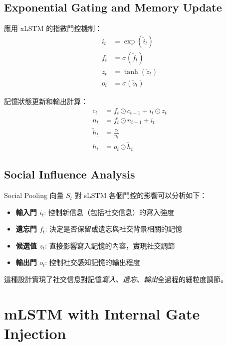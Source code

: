 \documentclass[11pt,a4paper]{article}
\begin{document}
\subsection{Exponential Gating and Memory Update}

應用 xLSTM 的指數門控機制：
\begin{align}
i_t &= \exp(\tilde{i}_t) \label{eq:slstm_exp_input} \\
f_t &= \sigma(\tilde{f}_t) \label{eq:slstm_sigmoid_forget} \\
z_t &= \tanh(\tilde{z}_t) \label{eq:slstm_tanh_candidate} \\
o_t &= \sigma(\tilde{o}_t) \label{eq:slstm_sigmoid_output}
\end{align}

記憶狀態更新和輸出計算：
\begin{align}
c_t &= f_t \odot c_{t-1} + i_t \odot z_t \label{eq:slstm_cell_update} \\
n_t &= f_t \odot n_{t-1} + i_t \label{eq:slstm_norm_update} \\
\tilde{h}_t &= \frac{c_t}{n_t} \label{eq:slstm_normalized_hidden} \\
h_t &= o_t \odot \tilde{h}_t \label{eq:slstm_final_hidden}
\end{align}

\subsection{Social Influence Analysis}

Social Pooling 向量 $S_t$ 對 sLSTM 各個門控的影響可以分析如下：

\begin{itemize}
\item \textbf{輸入門 $i_t$}: 控制新信息（包括社交信息）的寫入強度
\item \textbf{遺忘門 $f_t$}: 決定是否保留或遺忘與社交背景相關的記憶
\item \textbf{候選值 $z_t$}: 直接影響寫入記憶的內容，實現社交調節
\item \textbf{輸出門 $o_t$}: 控制社交感知記憶的輸出程度
\end{itemize}

這種設計實現了社交信息對記憶\textit{寫入}、\textit{遺忘}、\textit{輸出}全過程的細粒度調節。

\section{mLSTM with Internal Gate Injection}
\end{document}

